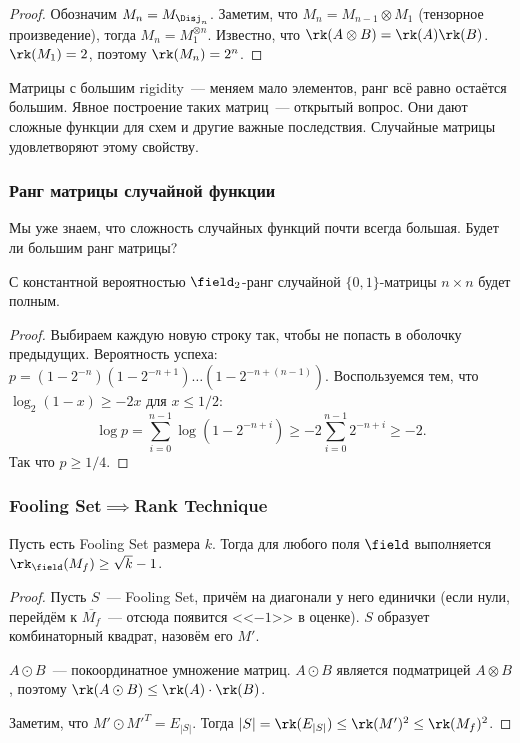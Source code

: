 \begin{proof}
    Обозначим $M_n = M_{\Disj_n}$. Заметим, что $M_n = M_{n - 1} \otimes M_1$ (тензорное произведение),
    тогда $M_n = M^{\otimes n}_1$. Известно, что $\rk(A \otimes B) = \rk(A) \rk(B)$. $\rk(M_1) = 2$,
    поэтому $\rk(M_n) = 2^n$. 
\end{proof}

Матрицы с большим rigidity~--- меняем мало элементов, ранг всё равно остаётся большим. Явное построение
таких матриц~--- открытый вопрос. Они дают сложные функции для схем и другие важные
последствия. Случайные матрицы удовлетворяют этому свойству.

\subsubsection{Ранг матрицы случайной функции}
Мы уже знаем, что сложность случайных функций почти всегда большая. Будет ли большим ранг матрицы?

\begin{theorem}
    С константной вероятностью $\field_2$-ранг случайной $\{0, 1\}$-матрицы $n \times n$ будет полным.
\end{theorem}

\begin{proof}
    Выбираем каждую новую строку так, чтобы не попасть в оболочку предыдущих. Вероятность успеха:
    $p = (1 - 2^{-n}) (1 - 2^{-n + 1}) \dots (1 - 2^{-n + (n - 1)})$. Воспользуемся тем, что $\log_2(1 -
    x) \ge -2x$ для $x \le 1 / 2$:
    $$
        \log p = \sum\limits_{i = 0}^{n - 1} \log(1-2^{-n+i}) \ge
        -2\sum\limits_{i = 0}^{n - 1} 2^{-n + i} \ge -2.
    $$
    Так что $p \ge 1 / 4$.
\end{proof}

\subsubsection{Fooling Set\texorpdfstring{$\implies$}{ => }Rank Technique}

\begin{theorem}
    Пусть есть Fooling Set размера $k$. Тогда для любого поля $\field$ выполняется $\rk_\field(M_f) \ge
    \sqrt{k} - 1$.
\end{theorem}

\begin{proof}
    Пусть $S$~--- Fooling Set, причём на диагонали у него единички (если нули, перейдём к
    $\overline{M_f}$~--- отсюда появится <<$-1$>> в оценке). $S$ образует комбинаторный квадрат, назовём
    его $M'$.

    $A \odot B$~--- покоординатное умножение матриц. $A \odot B$ является подматрицей $A \otimes B$,
    поэтому $\rk(A \odot B) \le \rk(A) \cdot \rk(B)$.

    Заметим, что $M' \odot M'^T = E_{|S|}$. Тогда $|S| = \rk(E_{|S|}) \le \rk(M')^2 \le \rk(M_f)^2$.
\end{proof}

